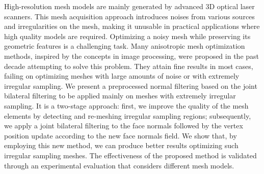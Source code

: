 High-resolution mesh models are mainly generated by advanced 3D optical laser scanners. This mesh acquisition approach introduces noises from various sources and irregularities on the mesh, making it unusable in practical applications where high quality models are required. Optimizing a noisy mesh while preserving its geometric features is a challenging task. Many anisotropic mesh optimization methods, inspired by the concepts in image processing, were proposed in the past decade attempting to solve this problem. They attain fine results in most cases, failing on optimizing meshes with large amounts of noise or with extremely irregular sampling. We present a preprocessed normal filtering based on the joint bilateral filtering to be applied mainly on meshes with extremely irregular sampling. It is a two-stage approach: first, we improve the quality of the mesh elements by detecting and re-meshing irregular sampling regions; subsequently, we apply a joint bilateral filtering to the face normals followed by the vertex position update according to the new face normals field. We show that, by employing this new method, we can produce better results optimizing such irregular sampling meshes. The effectiveness of the proposed method is validated through an experimental evaluation that considers different mesh models.

